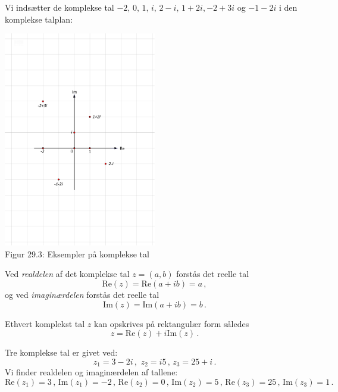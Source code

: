 \begin{example}
Vi indsætter de komplekse tal $-2,\,0,\,1,\,i,\,2-i,\,1+2i,-2+3i$ og $-1-2i$ i den komplekse talplan:
\begin{center}
	\includegraphics[trim=3cm 8cm 3cm 8cm,width=0.5\textwidth,clip]{Geometer/KompleksPlan3.pdf}\\
Figur 29.3: Eksempler på komplekse tal 
\end{center}
\end{example}

\begin{definition}
 
Ved \textit{realdelen} af det komplekse tal $z=(a,b)$ forstås det reelle tal
\begin{equation}
\mathrm{Re}(z)=\mathrm{Re}(a+ib)=a\,, 
\end{equation}
og ved \textit{imaginærdelen} forstås det reelle tal
\begin{equation}
\mathrm{Im}(z)=\mathrm{Im}(a+ib)=b\,.
\end{equation}
\end{definition}

\begin{aha}
Ethvert komplekst tal $z$ kan opskrives på rektangulær form således
$$z=\mathrm{Re}(z)+i\mathrm{Im}(z)\,.$$
\end{aha}

\begin{example}

Tre komplekse tal er givet ved:
$$z_1=3-2i\,,\,\,z_2=i5\,,\, z_3=25+i\,.$$
Vi finder realdelen og imaginærdelen af tallene:
\begin{equation}
\mathrm{Re}(z_1)=3\,,\,\mathrm{Im}(z_1)=-2\,,\,
\mathrm{Re}(z_2)=0\,,\,\mathrm{Im}(z_2)=5\,,\,
\mathrm{Re}(z_3)=25\,,\,\mathrm{Im}(z_3)=1\,.
\end{equation}
\end{example}


